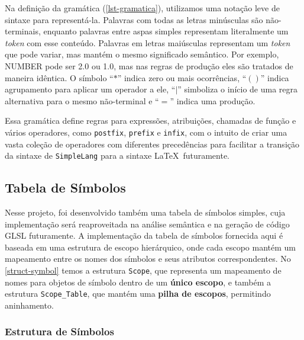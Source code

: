 \documentclass[english, 
               brazil, 
               bsc] %
               {dcomp-abntex2}
\begin{document}
  Na definição da gramática (\autoref{lst-gramatica}), utilizamos uma notação leve de sintaxe para representá-la. Palavras com todas as letras minúsculas são não-terminais, enquanto palavras entre aspas simples representam literalmente um \textit{token} com esse conteúdo. Palavras em letras maiúsculas representam um \textit{token} que pode variar, mas mantém o mesmo significado semântico. Por exemplo, NUMBER pode ser 2.0 ou 1.0, mas nas regras de produção eles são tratados de maneira idêntica. O símbolo ``$*$'' indica zero ou mais ocorrências, ``$()$'' indica agrupamento para aplicar um operador a ele, ``$|$'' simboliza o início de uma regra alternativa para o mesmo não-terminal e ``$=$'' indica uma produção.





Essa gramática define regras para expressões, atribuições, chamadas de função e vários operadores, como \texttt{postfix}, \texttt{prefix} e \texttt{infix}, com o intuito de criar uma vasta coleção de operadores com diferentes precedências para facilitar a transição da sintaxe de \texttt{SimpleLang} para a sintaxe \LaTeX\  futuramente.






\subsection{Tabela de Símbolos}


Nesse projeto, foi desenvolvido também uma tabela de símbolos simples, cuja implementação será reaproveitada na análise semântica e na geração de código GLSL futuramente. A implementação da tabela de símbolos fornecida aqui é baseada em uma estrutura de escopo hierárquico, onde cada escopo mantém um mapeamento entre os nomes dos símbolos e seus atributos correspondentes. No \autoref{struct-symbol} temos a estrutura \texttt{Scope}, que representa um mapeamento de nomes para objetos de símbolo dentro de um \textbf{único escopo}, e também a estrutura \texttt{Scope\_Table}, que mantém uma \textbf{pilha de escopos}, permitindo aninhamento.


\subsubsection{Estrutura de Símbolos}
\end{document}
